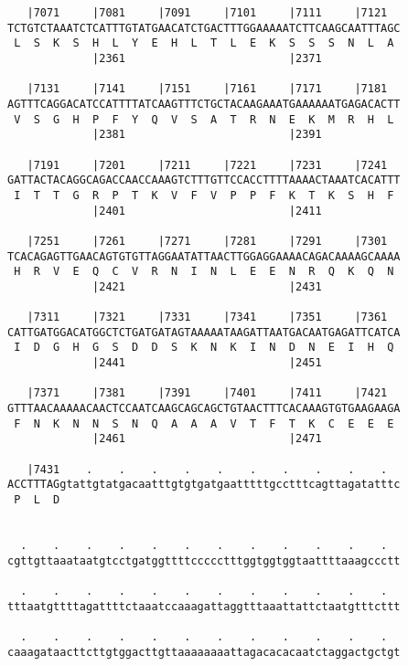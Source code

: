 \documentclass{article}
\begin{document}
\begin{Verbatim}
   |7071     |7081     |7091     |7101     |7111     |7121  
TCTGTCTAAATCTCATTTGTATGAACATCTGACTTTGGAAAAATCTTCAAGCAATTTAGC
 L  S  K  S  H  L  Y  E  H  L  T  L  E  K  S  S  S  N  L  A 
             |2361                         |2371            
  
   |7131     |7141     |7151     |7161     |7171     |7181  
AGTTTCAGGACATCCATTTTATCAAGTTTCTGCTACAAGAAATGAAAAAATGAGACACTT
 V  S  G  H  P  F  Y  Q  V  S  A  T  R  N  E  K  M  R  H  L 
             |2381                         |2391            
  
   |7191     |7201     |7211     |7221     |7231     |7241  
GATTACTACAGGCAGACCAACCAAAGTCTTTGTTCCACCTTTTAAAACTAAATCACATTT
 I  T  T  G  R  P  T  K  V  F  V  P  P  F  K  T  K  S  H  F 
             |2401                         |2411            
  
   |7251     |7261     |7271     |7281     |7291     |7301  
TCACAGAGTTGAACAGTGTGTTAGGAATATTAACTTGGAGGAAAACAGACAAAAGCAAAA
 H  R  V  E  Q  C  V  R  N  I  N  L  E  E  N  R  Q  K  Q  N 
             |2421                         |2431            
  
   |7311     |7321     |7331     |7341     |7351     |7361  
CATTGATGGACATGGCTCTGATGATAGTAAAAATAAGATTAATGACAATGAGATTCATCA
 I  D  G  H  G  S  D  D  S  K  N  K  I  N  D  N  E  I  H  Q 
             |2441                         |2451            
  
   |7371     |7381     |7391     |7401     |7411     |7421  
GTTTAACAAAAACAACTCCAATCAAGCAGCAGCTGTAACTTTCACAAAGTGTGAAGAAGA
 F  N  K  N  N  S  N  Q  A  A  A  V  T  F  T  K  C  E  E  E 
             |2461                         |2471            
  
   |7431    .    .    .    .    .    .    .    .    .    .  
ACCTTTAGgtattgtatgacaatttgtgtgatgaatttttgcctttcagttagatatttc
 P  L  D                                                    
                                                            
  
  .    .    .    .    .    .    .    .    .    .    .    .  
cgttgttaaataatgtcctgatggttttccccctttggtggtggtaattttaaagccctt
                                                            
  .    .    .    .    .    .    .    .    .    .    .    .  
tttaatgttttagattttctaaatccaaagattaggtttaaattattctaatgtttcttt
                                                            
  .    .    .    .    .    .    .    .    .    .    .    .  
caaagataacttcttgtggacttgttaaaaaaaattagacacacaatctaggactgctgt
                                                            

\end{Verbatim}
\end{document}
